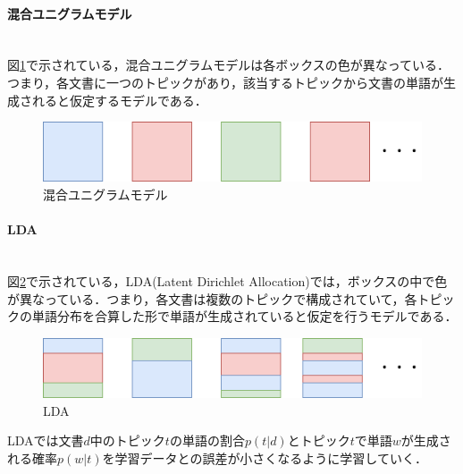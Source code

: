\paragraph{混合ユニグラムモデル}\ \\
図\ref{Fig:mixUnigram}で示されている，混合ユニグラムモデルは各ボックスの色が異なっている．つまり，各文書に一つのトピックがあり，該当するトピックから文書の単語が生成されると仮定するモデルである．
\begin{figure}[htbp]
 \begin{center}
  \includegraphics[width=\textwidth]{../images/2.Related_Work/topicModel-mixUnigram.png}
  \caption{混合ユニグラムモデル}
  \label{Fig:mixUnigram}
  \vspace{-10pt}
 \end{center}
\end{figure}
\paragraph{LDA}\ \\
図\ref{Fig:LDA}で示されている，LDA(Latent Dirichlet Allocation)\cite{LDA2003}では，ボックスの中で色が異なっている．つまり，各文書は複数のトピックで構成されていて，各トピックの単語分布を合算した形で単語が生成されていると仮定を行うモデルである．
\begin{figure}[htbp]
 \begin{center}
  \includegraphics[width=\textwidth]{../images/2.Related_Work/topicModel-LDA.png}
  \caption{LDA}
  \label{Fig:LDA}
  \vspace{-10pt}
 \end{center}
\end{figure}

LDAでは文書$d$中のトピック$t$の単語の割合$p(t|d)$とトピック$t$で単語$w$が生成される確率$p(w|t)$を学習データとの誤差が小さくなるように学習していく．

